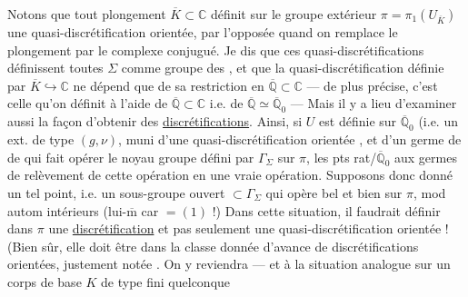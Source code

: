 Notons que tout plongement $\overline K\subset\mathbb C$
définit  sur le groupe extérieur
$\pi=\pi_1(U_{\overline K})$
une quasi-discrétification orientée, 
par l'opposée quand on remplace le plongement par le complexe conjugué.
  Je dis que ces
quasi-discrétifications définissent toutes $\Sigma$ comme groupe des
, et que la quasi-discrétification
définie par $\overline K\hookrightarrow\mathbb C$ ne dépend que de
sa restriction en
$\overline{\mathbb Q}\subset\mathbb C$
--- de  plus précise, c'est celle qu'on définit
 à l'aide de $\overline{\mathbb Q}\subset\mathbb C$ i.e. de
$\overline{\mathbb Q}\simeq\overline{\mathbb Q}_0$
--- Mais il y a lieu d'examiner aussi la façon d'obtenir des
\uline{discrétifications}. Ainsi, si  $U$ est définie
sur $\overline{\mathbb Q}_0$ (i.e. un \unsure{$\pi$|$\Pi$} ext. de type
$(g,\nu)$, muni d'une quasi-discrétification
orientée ,
et d'un germe de 
de
\unsure{)|,}
qui fait opérer  le noyau  groupe
défini par $\Gamma_{\Sigma}$ sur $\pi$, les pts rat/$\overline{\mathbb Q}_0$
 aux
 germes de relèvement de
cette opération\unsure{,}  en une vraie opération.
Supposons donc donné un tel point, i.e.
  un sous-groupe ouvert
$\subset\Gamma_{\Sigma}$
qui opère bel et bien sur $\pi$,
 mod autom intérieurs
(lui-$\overline{\mathrm m}$ 
car \unsure{$\pi^{\Gamma}$|$\overline\pi^{\Gamma}$}$=(1)$ !)
Dans cette situation, il faudrait définir dans $\pi$
une \uline{discrétification}
et pas seulement une quasi-discrétification orientée !
 (Bien sûr, elle doit être dans la classe   donnée d'avance
de  discrétifications orientées, 
justement notée .
On y reviendra --- et à la situation analogue sur un corps de
base $K$ de type fini quelconque

